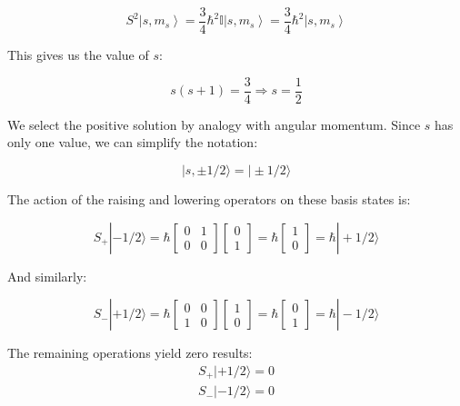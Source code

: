 \documentclass[italian]{HKNdocument}
\begin{document}
\begin{equation}
S^{2}\left|s, m_{s}\right\rangle=\frac{3}{4} \hbar^{2} \mathbb{I}\left|s, m_{s}\right\rangle=\frac{3}{4} \hbar^{2}\left|s, m_{s}\right\rangle \label{eq:11.15}
\end{equation}

This gives us the value of $s$:

\begin{equation}
s(s+1)=\frac{3}{4} \Longrightarrow s=\frac{1}{2} \label{eq:11.16}
\end{equation}

We select the positive solution by analogy with angular momentum. Since $s$ has only one value, we can simplify the notation:

\begin{equation}
|s, \pm 1/2\rangle=|\pm 1/2\rangle \label{eq:11.17}
\end{equation}

The action of the raising and lowering operators on these basis states is:

\[
S_{+}|-1/2\rangle=\hbar\left[\begin{array}{ll}
0 & 1  \label{eq:11.18}\\
0 & 0
\end{array}\right]\left[\begin{array}{l}
0 \\
1
\end{array}\right]=\hbar\left[\begin{array}{l}
1 \\
0
\end{array}\right]=\hbar|+1/2\rangle
\]

And similarly:

\[
S_{-}|+1/2\rangle=\hbar\left[\begin{array}{ll}
0 & 0  \label{eq:11.19}\\
1 & 0
\end{array}\right]\left[\begin{array}{l}
1 \\
0
\end{array}\right]=\hbar\left[\begin{array}{l}
0 \\
1
\end{array}\right]=\hbar|-1/2\rangle
\]


The remaining operations yield zero results:
\begin{align}
S_+|+1/2\rangle = 0\\
S_-|-1/2\rangle = 0
\end{align}
\end{document}
